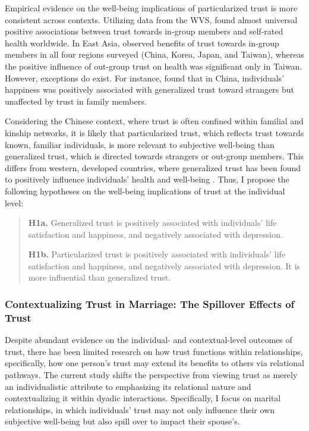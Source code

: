 Empirical evidence on the well-being implications of particularized trust is more consistent across contexts. Utilizing data from the WVS, \textcite{sungTrustHealthCrossnational2019} found almost universal positive associations between trust towards in-group members and self-rated health worldwide. In East Asia, \textcite{sungIngroupTrustSelfrated2020} observed benefits of trust towards in-group members in all four regions surveyed (China, Korea, Japan, and Taiwan), whereas the positive influence of out-group trust on health was significant only in Taiwan. However, exceptions do exist. For instance, \textcite{baiSocialTrustPattern2019} found that in China, individuals' happiness was positively associated with generalized trust toward strangers but unaffected by trust in family members.

Considering the Chinese context, where trust is often confined within familial and kinship networks, it is likely that particularized trust, which reflects trust towards known, familiar individuals, is more relevant to subjective well-being than generalized trust, which is directed towards strangers or out-group members. This differs from western, developed countries, where generalized trust has been found to positively influence individuals' health and well-being \parencite{sungTrustHealthCrossnational2019,sungIngroupTrustSelfrated2020}. Thus, I propose the following hypotheses on the well-being implications of trust at the individual level:

\begin{quote}
    \textbf{H1a.} Generalized trust is positively associated with individuals' life satisfaction and happiness, and negatively associated with depression.

    \textbf{H1b.} Particularized trust is positively associated with individuals' life satisfaction and happiness, and negatively associated with depression. It is more influential than generalized trust.
\end{quote}

\subsubsection{Contextualizing Trust in Marriage: The Spillover Effects of Trust}

Despite abundant evidence on the individual- and contextual-level outcomes of trust, there has been limited research on how trust functions within relationships, specifically, how one person's trust may extend its benefits to others via relational pathways. The current study shifts the perspective from viewing trust as merely an individualistic attribute to emphasizing its relational nature and contextualizing it within dyadic interactions. Specifically, I focus on marital relationships, in which individuals' trust may not only influence their own subjective well-being but also spill over to impact their spouse's.

